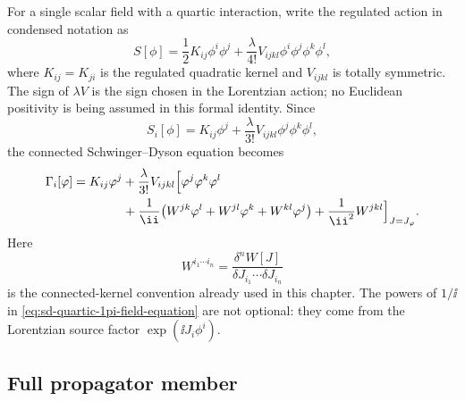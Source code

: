 For a single scalar field with a quartic interaction, write the regulated
action in condensed notation as
\[
  S[\phi]
  =
  \frac12 K_{ij}\phi^i\phi^j
  +
  \frac{\lambda}{4!}V_{ijkl}\phi^i\phi^j\phi^k\phi^l ,
\]
where \(K_{ij}=K_{ji}\) is the regulated quadratic kernel and
\(V_{ijkl}\) is totally symmetric.  The sign of \(\lambda V\) is the sign
chosen in the Lorentzian action; no Euclidean positivity is being assumed in
this formal identity.  Since
\[
  S_i[\phi]=K_{ij}\phi^j+\frac{\lambda}{3!}V_{ijkl}\phi^j\phi^k\phi^l,
\]
the connected Schwinger--Dyson equation becomes
\begin{equation}
\begin{aligned}
  \Gamma_i[\varphi]
  &=
  K_{ij}\varphi^j
  +
  \frac{\lambda}{3!}V_{ijkl}
  \Bigl[
    \varphi^j\varphi^k\varphi^l   \\
  &\qquad\qquad
    +\frac1{\ii}
      \bigl(
        W^{jk}\varphi^l
        +W^{jl}\varphi^k
        +W^{kl}\varphi^j
      \bigr)
    +\frac1{\ii^2}W^{jkl}
  \Bigr]_{J=J_\varphi}.
\end{aligned}
  \label{eq:sd-quartic-1pi-field-equation}
\end{equation}
Here
\[
  W^{i_1\cdots i_n}
  =
  \frac{\delta^nW[J]}
       {\delta J_{i_1}\cdots\delta J_{i_n}}
\]
is the connected-kernel convention already used in this chapter.  The powers
of \(1/\ii\) in \eqref{eq:sd-quartic-1pi-field-equation} are not optional:
they come from the Lorentzian source factor \(\exp(\ii J_i\phi^i)\).

\subsection*{Full propagator member}

